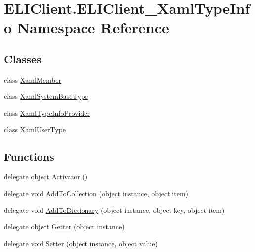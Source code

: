 \hypertarget{namespace_e_l_i_client_1_1_e_l_i_client___xaml_type_info}{}\section{E\+L\+I\+Client.\+E\+L\+I\+Client\+\_\+\+Xaml\+Type\+Info Namespace Reference}
\label{namespace_e_l_i_client_1_1_e_l_i_client___xaml_type_info}
\subsection*{Classes}
\begin{DoxyCompactItemize}
\item 
class \hyperlink{class_e_l_i_client_1_1_e_l_i_client___xaml_type_info_1_1_xaml_member}{Xaml\+Member}
\item 
class \hyperlink{class_e_l_i_client_1_1_e_l_i_client___xaml_type_info_1_1_xaml_system_base_type}{Xaml\+System\+Base\+Type}
\item 
class \hyperlink{class_e_l_i_client_1_1_e_l_i_client___xaml_type_info_1_1_xaml_type_info_provider}{Xaml\+Type\+Info\+Provider}
\item 
class \hyperlink{class_e_l_i_client_1_1_e_l_i_client___xaml_type_info_1_1_xaml_user_type}{Xaml\+User\+Type}
\end{DoxyCompactItemize}
\subsection*{Functions}
\begin{DoxyCompactItemize}
\item 
delegate object \hyperlink{namespace_e_l_i_client_1_1_e_l_i_client___xaml_type_info_a8b6d6f16dba61b3ff78f1664e15e8ba6}{Activator} ()
\item 
delegate void \hyperlink{namespace_e_l_i_client_1_1_e_l_i_client___xaml_type_info_a911f5e2273e056b5e19fb485d0738439}{Add\+To\+Collection} (object instance, object item)
\item 
delegate void \hyperlink{namespace_e_l_i_client_1_1_e_l_i_client___xaml_type_info_aeed6ff3f2a0b46176be771c9b3f4fd4c}{Add\+To\+Dictionary} (object instance, object key, object item)
\item 
delegate object \hyperlink{namespace_e_l_i_client_1_1_e_l_i_client___xaml_type_info_a19405237675f90ae48d8195684bf8e75}{Getter} (object instance)
\item 
delegate void \hyperlink{namespace_e_l_i_client_1_1_e_l_i_client___xaml_type_info_abcbc694bfdc687d847f32cf36dd265e3}{Setter} (object instance, object value)
\end{DoxyCompactItemize}


